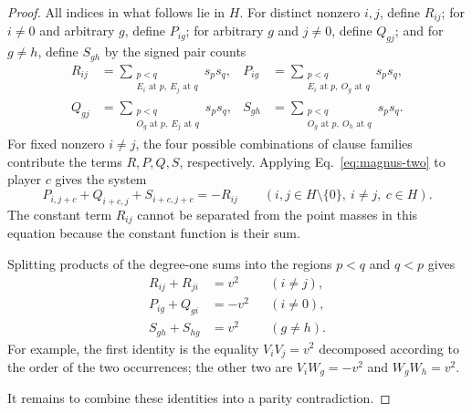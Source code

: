 \documentclass[11pt]{article}
\theoremstyle{definition}
\theoremstyle{remark}
\numberwithin{equation}{section}
\begin{document}
\begin{proof}
All indices in what follows lie in \(H\).  For distinct nonzero \(i,j\),
define \(R_{ij}\); for \(i\ne0\) and arbitrary \(g\), define \(P_{ig}\);
for arbitrary \(g\) and \(j\ne0\), define \(Q_{gj}\); and for \(g\ne h\),
define \(S_{gh}\) by the signed pair counts
\begin{align*}
  R_{ij}
  &=
  \sum_{\substack{p<q\\E_i\text{ at }p,\ E_j\text{ at }q}}s_ps_q,
  &
  P_{ig}
  &=
  \sum_{\substack{p<q\\E_i\text{ at }p,\ O_g\text{ at }q}}s_ps_q,\\
  Q_{gj}
  &=
  \sum_{\substack{p<q\\O_g\text{ at }p,\ E_j\text{ at }q}}s_ps_q,
  &
  S_{gh}
  &=
  \sum_{\substack{p<q\\O_g\text{ at }p,\ O_h\text{ at }q}}s_ps_q.
\end{align*}
For fixed nonzero \(i\ne j\), the four possible combinations of clause
families contribute the terms \(R,P,Q,S\), respectively.  Applying
Eq.~\eqref{eq:magnus-two} to player \(c\) gives the system
\begin{equation}\label{eq:Eprime-app}
  P_{i,j+c}+Q_{i+c,j}+S_{i+c,j+c}=-R_{ij}
  \qquad(i,j\in H\setminus\{0\},\ i\ne j,\ c\in H).
\end{equation}
The constant term \(R_{ij}\) cannot be separated from the point masses in
this equation because the constant function is their sum.

Splitting products of the degree-one sums into the regions \(p<q\) and
\(q<p\) gives
\begin{align}
  R_{ij}+R_{ji}&=v^2 &&(i\ne j),\label{eq:VV-app}\\
  P_{ig}+Q_{gi}&=-v^2 &&(i\ne0),\label{eq:PW-app}\\
  S_{gh}+S_{hg}&=v^2 &&(g\ne h).\label{eq:WW-app}
\end{align}
For example, the first identity is the equality
\(V_iV_j=v^2\) decomposed according to the order of the two occurrences;
the other two are \(V_iW_g=-v^2\) and \(W_gW_h=v^2\).

It remains to combine these identities into a parity contradiction.


\end{proof}
\end{document}
